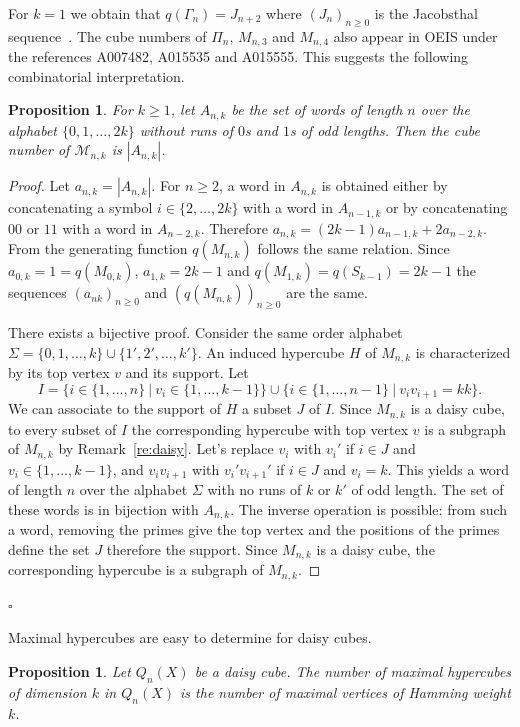 \documentclass[11pt]{article}
\newtheorem{proposition}[theorem]{\bf Proposition}
\newcommand{\qed}{\hfill $\square$ \bigskip}
\newcommand{\M}{\mathcal{M}}
\newcommand{\st}{ ~|~ }
\begin{document}
For $k=1$ we obtain that $q(\Gamma_n)=J_{n+2}$ where  $(J_n)_{n\geq0}$ is the Jacobsthal sequence~\cite[A001045]{Sloane}. The cube numbers of $\Pi_n$, $M_{n,3}$ and $M_{n,4}$ also appear in OEIS \cite{Sloane} under the references A007482, A015535 and A015555. This suggests the following combinatorial interpretation.

\begin{proposition} 
For $k\geq 1$, let $A_{n,k}$ be the set of words of length $n$ over the alphabet $\{0,1,\ldots,2k\}$ without runs of $0$s and $1$s of odd lengths.  Then the cube number of $\M_{n,k}$ is $|A_{n,k}|$.
\end{proposition}
 \begin{proof}
Let $a_{n,k}=|A_{n,k}|$. For $n\geq 2$, a word in $A_{n,k}$ is obtained either by concatenating  a symbol $i\in \{2,\ldots,2k\}$  with a word in $A_{n-1,k}$ or by concatenating  $00$  or  $11$ with a word in $A_{n-2,k}$. Therefore 
$a_{n,k}=(2k-1)a_{n-1,k}+2a_{n-2,k}$.  From the generating function  $q(M_{n,k})$ follows the same relation. Since $a_{0,k}=1=q(M_{0,k})$,  $a_{1,k}=2k-1$ and $q(M_{1,k})=q(S_{k-1})=2k-1$ the sequences $(a_{nk})_{n\geq 0}$ and $(q(M_{n,k}))_{n \geq 0}$ are the same.

There exists a bijective proof. Consider the same order alphabet $\Sigma=\{0,1,\ldots,k\}\cup\{1',2',\ldots,k'\}$.  An induced hypercube  $H$ of $M_{n,k}$ is 
characterized by its top vertex $v$ and its support. Let $$I=\{i\in\{1,\ldots ,n\} \st v_i\in\{1,\ldots, k-1\}\}\cup \{i\in\{1,\ldots ,n-1\} \st v_iv_{i+1}=kk \}.$$ We can associate to the support of $H$ a subset $J$ of $I$. Since  $M_{n,k}$ is a daisy cube, to every subset of $I$ the corresponding hypercube with top vertex $v$ is a subgraph of $M_{n,k}$ by Remark~\ref{re:daisy}. Let's replace $v_i$ with $v_i'$ if $i\in J$ and $v_i\in\{1,\ldots,k-1\}$, and  $v_iv_{i+1}$ with $v_i'v_{i+1}'$ if $i\in J$ and $v_i=k$. This yields a word of length $n$ over the alphabet $\Sigma$ with no runs of $k$ or $k'$  of odd length. The set of these words is in bijection with $A_{n,k}$. The inverse operation is possible: from such a word, removing the primes give the top vertex and the positions of the primes define the set $J$ therefore the support. Since $M_{n,k}$ is a daisy cube, the corresponding hypercube is a subgraph of $M_{n,k}$. 
\end{proof}
\qed

Maximal hypercubes are easy to determine for daisy cubes.

\begin{proposition}\cite[Proposition 9.69]{EKM-2023}
\label{pro:daisymax}
Let $Q_n(X)$ be a daisy cube. The number of maximal hypercubes of dimension $k$ in $Q_n(X)$ is the number of maximal vertices of Hamming weight $k$. 
\end{proposition}
\end{document}
